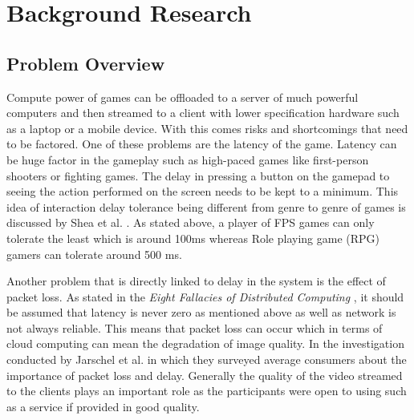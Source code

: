 \chapter{Background Research}
\label{chapter2}

\section{Problem Overview}
Compute power of games can be offloaded to a server of much powerful computers and then streamed to a client with lower specification hardware such as a laptop or a mobile device. With this comes risks and shortcomings that need to be factored. One of these problems are the latency of the game. Latency can be huge factor in the gameplay such as high-paced games like first-person shooters or fighting games. The delay in pressing a button on the gamepad to seeing the action performed on the screen needs to be kept to a minimum. This idea of interaction delay tolerance being different from genre to genre of games is discussed by Shea et al. \cite{shea2013cloud}. As stated above, a player of FPS games can only tolerate the least which is around 100ms whereas Role playing game (RPG) gamers can tolerate around 500 ms.
\par
Another problem that is directly linked to delay in the system is the effect of packet loss. As stated in the \textit{Eight Fallacies of Distributed Computing} \cite{deutsch1994eight}, it should be assumed that latency is never zero as mentioned above as well as network is not always reliable. This means that packet loss can occur which in terms of cloud computing can mean the degradation of image quality. In the investigation conducted by Jarschel et al. \cite{jarschel2011evaluation} in which they surveyed average consumers about the importance of packet loss and delay. Generally the quality of the video streamed to the clients plays an important role as the participants were open to using such as a service if provided in good quality.

